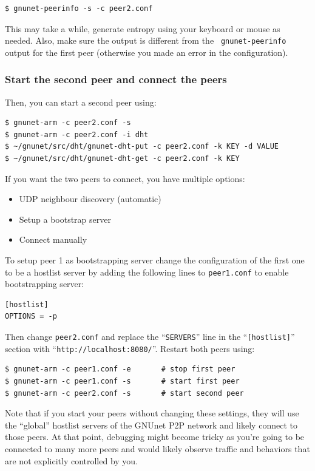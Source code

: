 \documentclass[10pt]{article}
\begin{document}
\lstset{language=bash}
\begin{lstlisting}
$ gnunet-peerinfo -s -c peer2.conf
\end{lstlisting}

This may take a while, generate entropy using your keyboard or mouse
as needed.  Also, make sure the output is different from the {\tt
  gnunet-peerinfo} output for the first peer (otherwise you made an
error in the configuration).

\subsubsection{Start the second peer and connect the peers}

Then, you can start a second peer using:
\lstset{language=bash}
\begin{lstlisting}
$ gnunet-arm -c peer2.conf -s
$ gnunet-arm -c peer2.conf -i dht
$ ~/gnunet/src/dht/gnunet-dht-put -c peer2.conf -k KEY -d VALUE
$ ~/gnunet/src/dht/gnunet-dht-get -c peer2.conf -k KEY
\end{lstlisting}
If you want the two peers to connect, you have multiple options:
\begin{itemize}
\itemsep0em
  \item UDP neighbour discovery (automatic)
  \item Setup a bootstrap server
  \item Connect manually
\end{itemize}
To setup peer 1 as bootstrapping server change the configuration of
the first one to be a hostlist server by adding the following lines to
\texttt{peer1.conf} to enable bootstrapping server:
 \begin{verbatim}
[hostlist]
OPTIONS = -p
\end{verbatim}

Then change {\tt peer2.conf} and replace the ``\texttt{SERVERS}'' line in the ``\texttt{[hostlist]}'' section with
``\texttt{http://localhost:8080/}''.  Restart both peers using:
\begin{lstlisting}
$ gnunet-arm -c peer1.conf -e		# stop first peer
$ gnunet-arm -c peer1.conf -s		# start first peer
$ gnunet-arm -c peer2.conf -s		# start second peer
\end{lstlisting}

Note that if you start your peers without changing these settings, they
will use the ``global'' hostlist servers of the GNUnet P2P network and
likely connect to those peers.  At that point, debugging might become
tricky as you're going to be connected to many more peers and would
likely observe traffic and behaviors that are not explicitly controlled
by you.
\end{document}
